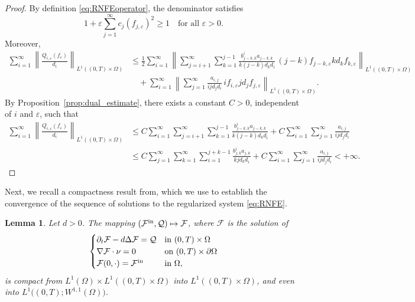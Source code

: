 \documentclass[a4paper,12pt,reqno]{amsart}
\theoremstyle{plain}
\newtheorem{lem}[thm]{Lemma}
\numberwithin{equation}{section}
\begin{document}
	\begin{proof}
		By definition \eqref{eq:RNFEoperator}, the denominator satisfies
		\[
		1+\varepsilon\sum_{j=1}^{\infty} c_j (f_{j,\varepsilon})^2 \ge 1
		\quad \text{for all } \varepsilon>0.
		\]
		Moreover,
		\begin{align*}
			\sum_{i=1}^\infty \left\|
			\frac{Q_{i,\varepsilon}(f_{\varepsilon})}{d_i}
			\right\|_{L^1((0,T)\times\Omega)}
			&\le
			\frac{1}{2}\sum_{i=1}^\infty\left\|
			\sum_{j=i+1}^{\infty} \sum_{k=1}^{j-1}
			\frac{b_{j-k,k}^i a_{j-k,k}}{k(j-k)d_{k}d_i}\,
			(j-k)f_{j-k,\varepsilon} kd_kf_{k,\varepsilon}
			\right\|_{L^1((0,T)\times\Omega)}
			\\
			&\quad+\sum_{i=1}^\infty
			\left\|
			\sum_{j=1}^{\infty}
			\frac{a_{i,j}}{ijd_jd_i}\, if_{i,\varepsilon} jd_jf_{j,\varepsilon}
			\right\|_{L^1((0,T)\times\Omega)}.
		\end{align*}
		By Proposition~\ref{prop:dual_estimate}, there exists a constant $C>0$, independent of $i$ and $\varepsilon$, such that
		\begin{align*}
			\sum_{i=1}^\infty \left\|
			\frac{Q_{i,\varepsilon}(f_{\varepsilon})}{d_i}
			\right\|_{L^1((0,T)\times\Omega)}
			&\le
			C\sum_{i=1}^\infty
			\sum_{j=i+1}^{\infty} \sum_{k=1}^{j-1}
			\frac{b_{j-k,k}^i a_{j-k,k}}{k(j-k)d_{k}d_i}+C\sum_{i=1}^\infty
			\sum_{j=1}^{\infty}
			\frac{a_{i,j}}{ijd_jd_i}\\
			&\le C
			\sum_{j=1}^{\infty} \sum_{k=1}^{\infty}\sum_{i=1}^{j+k-1}
			\frac{b_{j,k}^i a_{j,k}}{kjd_{k}d_i}+C\sum_{i=1}^\infty
			\sum_{j=1}^{\infty}
			\frac{a_{i,j}}{ijd_jd_i} <+\infty.
		\end{align*}
	\end{proof}
	Next, we recall a compactness result from\cite{baras1984, bothe2010, Pierre2010}, which we
	use to establish the convergence of the sequence of solutions to the regularized system \eqref{eq:RNFE}.
	\begin{lem}\label{lem:compactness}
		Let $d>0$. The mapping $( \mathcal{F}^{\rm{in}}, \mathcal{Q})\mapsto \mathcal{F}$, where $\mathcal{F}$ is the solution of
		\begin{equation}\label{eq:compactness_heat}
			\begin{cases}
				\partial_t \mathcal{F} - d \Delta \mathcal{F} = \mathcal{Q} & \text{in } (0,T)\times \Omega \\
				\nabla \mathcal{F}\cdot\nu = 0 & \text{on }  (0,T) \times \partial\Omega \\
				\mathcal{F}(0,\cdot) =  \mathcal{F}^{\rm{in}} & \text{in } \Omega,
			\end{cases}
		\end{equation}
		is compact from $L^{1}(\Omega)\times L^{1}((0,T)\times \Omega)$ into
		$L^{1}((0,T)\times \Omega)$, and even into
		$L^{1}\big((0,T); W^{1,1}(\Omega)\big)$.
	\end{lem}
\end{document}
